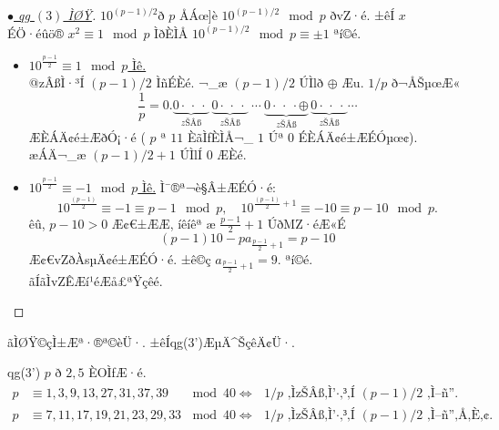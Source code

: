 \documentclass{jsarticle}
\theoremstyle{definition}
\begin{document}
\begin{proof}[\underline{$\bullet$ qg $\mathrm{(3)}$ ÌØŸ}] $10^{(p-1)/2}$ð $p$ ÅÁœ]è $10^{(p-1)/2}\mod p$ ðvZ·é.
±êÍ $x$ ÉÖ·éûö® $x^2\equiv 1 \mod p$ ÌðÈÌÅ $10^{(p-1)/2}\mod p\equiv \pm 1$ ªí©é.
\begin{itemize}
\item \underline{$10^{\frac{p-1}{2}}\equiv 1 \mod p$ Ìê.}
\\
@zÂßÌ·³Í $(p-1)/2$ ÌñÉÈé.
¬_æ $(p-1)/2$ ÚÌlð $\oplus$ Æu­. $1/p$ ð¬Å\ŠµœÆ«
\[
\frac{1}{p}=0.\underset{zÂß}{\underbrace{0\cdot\,\cdot\ \cdot\,}}\,\underset{zÂß}{\underbrace{0\cdot\,\cdot\ \cdot\,}}\ \cdots\ \underset{zÂß}{\underbrace{0\cdot\,\cdot\ \cdot\oplus}}\,\underset{zÂß}{\underbrace{0\cdot\,\cdot\ \cdot\,}}\cdots
\]
ÆÈÁÄ¢é±ÆðÓ¡·é
( $p$ ª $11$ ÈãÌfÈÌÅ¬_ $1$ Úª $0$ ÉÈÁÄ¢é±ÆÉÓµœ¢).
æÁÄ¬_æ $(p-1)/2+1$ ÚÌlÍ $0$ ÆÈé.
\\
\item \underline{$10^{\frac{p-1}{2}}\equiv -1 \mod p$ Ìê.} Ì¯®ª¬è§Â±ÆÉÓ·é:
\[
10^{\frac{(p-1)}{2}}\equiv -1 \equiv p-1 \mod p ,\quad 10^{\frac{(p-1)}{2}+1}\equiv -10 \equiv p-10 \mod p.
\]
êû, $p-10 > 0$ Æ¢€±ÆÆ, íêíêª ­æ $\frac{p-1}{2}+1$ ÚðMZ·éÆ«É
\[
(p-1)10 -p a_{\frac{p-1}{2}+1}=p-10
\]
Æ¢€vZðÀsµÄ¢é±ÆÉÓ·é.
±ê©ç $a_{\frac{p-1}{2}+1}=9.$ ªí©é.
\\
ãÍãÌvZÊÆí¹éÆå£ªŸçêé.
\end{itemize}
\end{proof}
\newpage
ãÌØŸ©çÌ±Æª·®ª©èÜ·.
±êÍqg(3')ÆµÄ^ŠçêÄ¢Ü·.
\begin{itembox}[|]{qg(3')}
$p$ ð $2,5$ ÈOÌfÆ·é.
\begin{align*}
p&\equiv 1,3,9,13,27,31,37,39\, \quad\mod 40    \Longleftrightarrow  \text{ $1/p$ ÌzÂßÌ·³Í $(p-1)/2$ Ìñ.}
\\
p&\equiv 7,11,17,19,21,23,29,33\,\mod 40 \Longleftrightarrow \text{ $1/p$ ÌzÂßÌ·³Í $(p-1)/2$ ÌñÅÈ¢.}
\end{align*}
\end{itembox}
\end{document}

